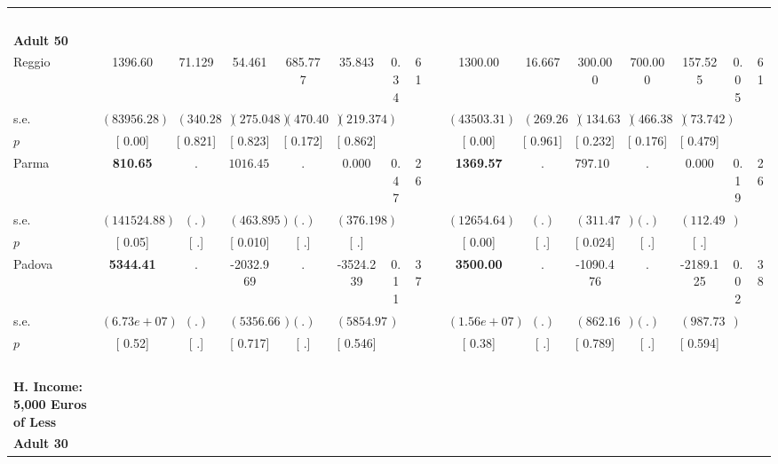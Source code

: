 \begin{longtable}{L{8em} c c c c c c c p{1em} c c c c c c c}
~\\[1em]
\quad \quad \textbf{Adult 50} & & & & & & & & & & & & & & & \\* 
\quad \quad \quad Reggio& 1396.60 &    71.129 &    54.461 &   685.777 &    35.843 &      0.34 &        61 & & 1300.00 &    16.667 &   300.000 &   700.000 &   157.525 &      0.05 &        61  \\*
\quad \quad \quad \quad s.e.& $ ( 83956.28)$ & $ (  340.284)$ & $ (  275.048)$ & $ (  470.403)$ & $ (  219.374)$ & & & & $ ( 43503.31)$ & $ (  269.268)$ & $ (  134.634)$ & $ (  466.387)$ & $ (   73.742)$ & &  \\*
\quad \quad \quad \quad $ p$ & [     0.00] & [    0.821] & [    0.823] & [    0.172] & [    0.862] & & & & [     0.00] & [    0.961] & [    0.232] & [    0.176] & [    0.479] & &  \\[1em]
\quad \quad \quad Parma& \textbf{   810.65} &         . & $ \mathbf{ 1016.459}$ &         . &     0.000 &      0.47 &        26 & & \textbf{  1369.57} &         . & $ \mathbf{  797.101}$ &         . &     0.000 &      0.19 &        26  \\*
\quad \quad \quad \quad s.e.& $ (141524.88)$ & $ (        .)$ & $ (  463.895)$ & $ (        .)$ & $ (  376.198)$ & & & & $ ( 12654.64)$ & $ (        .)$ & $ (  311.479)$ & $ (        .)$ & $ (  112.493)$ & &  \\*
\quad \quad \quad \quad $ p$ & [     0.05] & [        .] & [    0.010] & [        .] & [        .] & & & & [     0.00] & [        .] & [    0.024] & [        .] & [        .] & &  \\[1em]
\quad \quad \quad Padova& \textbf{  5344.41} &         . & -2032.969 &         . & -3524.239 &      0.11 &        37 & & \textbf{  3500.00} &         . & -1090.476 &         . & -2189.125 &      0.02 &        38  \\*
\quad \quad \quad \quad s.e.& $ ( 6.73e+07)$ & $ (        .)$ & $ ( 5356.668)$ & $ (        .)$ & $ ( 5854.976)$ & & & & $ ( 1.56e+07)$ & $ (        .)$ & $ (  862.168)$ & $ (        .)$ & $ (  987.737)$ & &  \\*
\quad \quad \quad \quad $ p$ & [     0.52] & [        .] & [    0.717] & [        .] & [    0.546] & & & & [     0.38] & [        .] & [    0.789] & [        .] & [    0.594] & &  \\[1em]
~\\[1em]
\textbf{H. Income: 5,000 Euros of Less} \\*
\quad \quad \textbf{Adult 30} & & & & & & & & & & & & & & & \\* 

\end{longtable}
